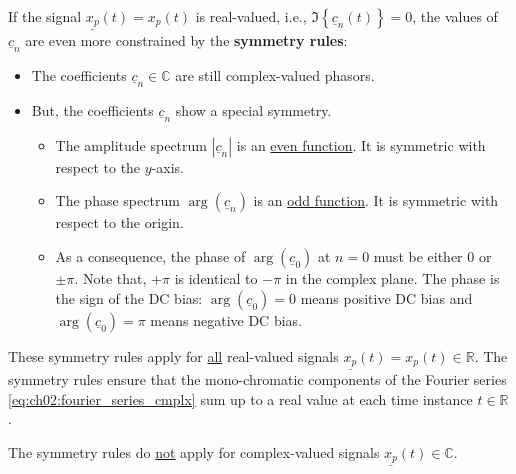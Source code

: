 \begin{refsection}
If the signal $\underline{x_p}(t) = x_p(t)$ is real-valued, i.e., $\Im\left\{\underline{c}_n(t)\right\} = 0$, the values of $\underline{c}_n$ are even more constrained by the  \textbf{symmetry rules}:
\begin{itemize}
	\item The coefficients $\underline{c}_n \in \mathbb{C}$ are still complex-valued phasors.
	\item But, the coefficients $\underline{c}_n$ show a special symmetry.
	\begin{itemize}
		\item The amplitude spectrum $|\underline{c}_n|$ is an \underline{even function}. It is symmetric with respect to the $y$-axis.
		\item The phase spectrum $\arg\left(\underline{c}_n\right)$ is an \underline{odd function}. It is symmetric with respect to the origin.
		\item As a consequence, the phase of $\arg\left(\underline{c}_0\right)$ at $n = 0$ must be either $0$ or $\pm \pi$. Note that, $+\pi$ is identical to $-\pi$ in the complex plane. The phase is the sign of the \ac{DC} bias: $\arg\left(\underline{c}_0\right) = 0$ means positive \ac{DC} bias and $\arg\left(\underline{c}_0\right) = \pi$ means negative \ac{DC} bias.
	\end{itemize}
\end{itemize}
These symmetry rules apply for \underline{all} real-valued signals $\underline{x_p}(t) = x_p(t) \in \mathbb{R}$. The symmetry rules ensure that the mono-chromatic components of the Fourier series \eqref{eq:ch02:fourier_series_cmplx} sum up to a real value at each time instance $t \in \mathbb{R}$.

The symmetry rules do \underline{not} apply for complex-valued signals $\underline{x_p}(t) \in \mathbb{C}$.


\end{refsection}
